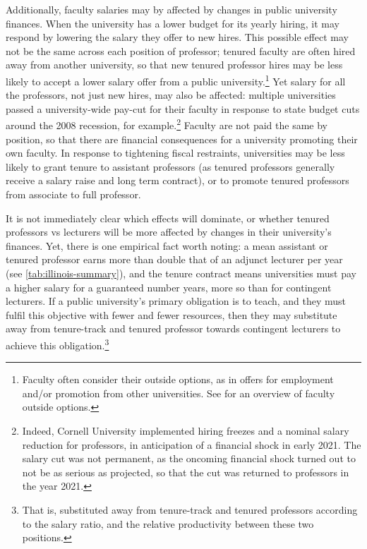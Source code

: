 Additionally, faculty salaries may by affected by changes in public university finances.
When the university has a lower budget for its yearly hiring, it may respond by lowering the salary they offer to new hires.
This possible effect may not be the same across each position of professor; tenured faculty are often hired away from another university, so that new tenured professor hires may be less likely to accept a lower salary offer from a public university.\footnote{
    Faculty often consider their outside options, as in offers for employment and/or promotion from other universities.
    See \cite{blackaby2005} for an overview of faculty outside options.
}
Yet salary for all the professors, not just new hires, may also be affected: multiple universities passed a university-wide pay-cut for their faculty in response to state budget cuts around the 2008 recession, for example.\footnote{
    Indeed, Cornell University implemented hiring freezes and a nominal salary reduction for professors, in anticipation of a financial shock in early 2021.
    The salary cut was not permanent, as the oncoming financial shock turned out to not be as serious as projected, so that the cut was returned to professors in the year 2021.
}
Faculty are not paid the same by position, so that there are financial consequences for a university promoting their own faculty.
In response to tightening fiscal restraints, universities may be less likely to grant tenure to assistant professors (as tenured professors generally receive a salary raise and long term contract), or to promote tenured professors from associate to full professor.

It is not immediately clear which effects will dominate, or whether tenured professors vs lecturers will be more affected by changes in their university's finances.
Yet, there is one empirical fact worth noting: a mean assistant or tenured professor earns more than double that of an adjunct lecturer per year (see \autoref{tab:illinois-summary}), and the tenure contract means universities must pay a higher salary for a guaranteed number years, more so than for contingent lecturers.
If a public university's primary obligation is to teach, and they must fulfil this objective with fewer and fewer resources, then they may substitute away from tenure-track and tenured professor towards contingent lecturers to achieve this obligation.\footnote{
    That is, substituted away from tenure-track and tenured professors according to the salary ratio, and the relative productivity between these two positions.
}
